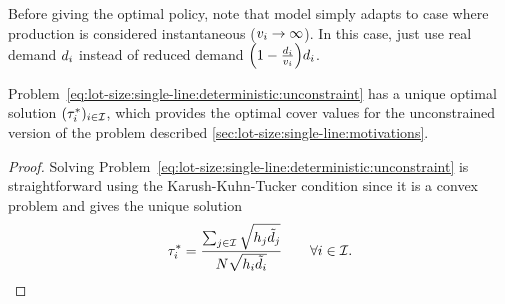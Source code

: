 Before giving the optimal policy, note that model simply adapts to case where production is considered instantaneous (\ie $v_i\rightarrow\infty$).
In this case, just use real demand $d_i$ instead of reduced demand $\bracket{1-\frac{\demand_i}{\rate_i}}\demand_i$.




\begin{prop}
Problem~\eqref{eq:lot-size:single-line:deterministic:unconstraint} has a unique optimal solution $(\tau_i^*)_{i\in\mathcal{I}}$, which provides the optimal cover values for the unconstrained version of the problem described \cref{sec:lot-size:single-line:motivations}.
\end{prop}


\begin{proof}
Solving Problem~\eqref{eq:lot-size:single-line:deterministic:unconstraint} is straightforward using the Karush-Kuhn-Tucker condition since it is a convex problem and gives the unique solution
\begin{equation}
  \tau_i^*= \frac{\sum_{j\in\mathcal{I}}\sqrt{h_j\tilde{d}_j}}{N\sqrt{h_i\tilde{d}_i}}\qquad\forall i\in\mathcal{I}.
\end{equation}
\end{proof}





